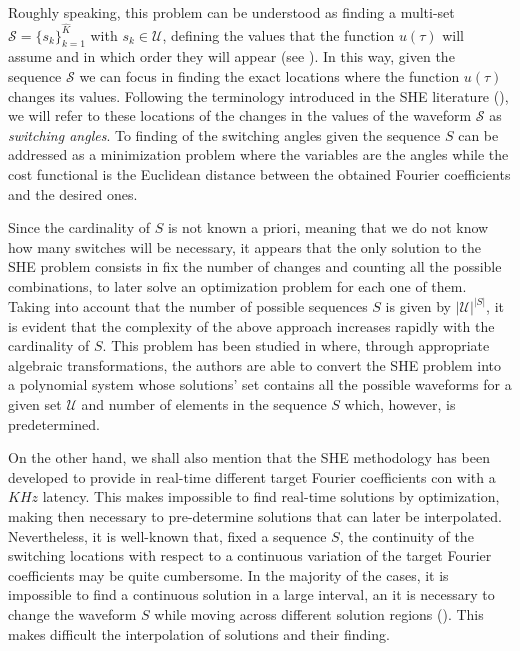 Roughly speaking, this problem can be understood as finding a multi-set $\mathcal S = \{s_k\}_{k=1}^{\widehat K}$ with $s_k\in\mathcal U$, defining the values that the function $u(\tau)$ will assume and in which order they will appear (see \cite{Konstantinou2010}).
%
In this way, given the sequence $\mathcal S$ we can focus in finding the exact locations where the function $u(\tau)$ changes its values.
%
Following the terminology introduced in the SHE literature (\cite{Yang2015,Konstantinou2010,Sun1996}), we will refer to these locations of the changes in the values of the waveform $\mathcal{S}$ as \textit{switching angles}.
%
To finding of the switching angles given the sequence $S$ can be addressed as a minimization problem where the variables are the angles while the cost functional is the Euclidean distance between the obtained Fourier coefficients and the desired ones.

Since the cardinality of $S$ is not known a priori, meaning that we do not know how many switches will be necessary, it appears that the only solution to the SHE problem consists in fix the number of changes and counting all the possible combinations, to later solve an optimization problem for each one of them.
%
Taking into account that the number of possible sequences $S$ is given by $|\mathcal{U}|^{|S|}$, it is evident that the complexity of the above approach increases rapidly with the cardinality of $S$.
%
This problem has been studied in \cite{Yang2015} where, through appropriate algebraic transformations, the authors are able to convert the SHE problem into a polynomial system whose solutions' set contains all the possible waveforms for a given set $\mathcal{U}$ and number of elements in the sequence $S$ which, however, is predetermined. 
%

On the other hand, we shall also mention that the SHE methodology has been developed to provide in real-time different target Fourier coefficients con with a $KHz$ latency. 
%
This makes impossible to find real-time solutions by optimization, making then necessary to pre-determine solutions that can later be interpolated.
%
Nevertheless, it is well-known that, fixed a sequence $S$, the continuity of the switching locations with respect to a continuous variation of the target Fourier coefficients may be quite cumbersome. 
%
In the majority of the cases, it is impossible to find a continuous solution in a large interval, an it is necessary to change the waveform $S$ while moving across different solution regions (\cite{Yang2015,Yang2017}). This makes difficult the interpolation of solutions and their finding.

